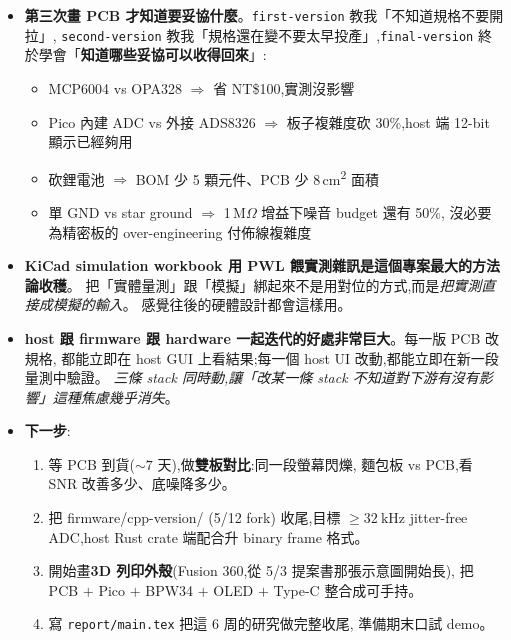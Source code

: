\begin{itemize}[leftmargin=2em,itemsep=0pt]
  \item \textbf{第三次畫 PCB 才知道要妥協什麼}。\texttt{first-version} 教我「不知道規格不要開拉」,
        \texttt{second-version} 教我「規格還在變不要太早投產」,\texttt{final-version}
        終於學會「\textbf{知道哪些妥協可以收得回來}」:
        \begin{itemize}[leftmargin=2em,itemsep=0pt]
          \item MCP6004 vs OPA328 \(\Rightarrow\) 省 NT\$100,實測沒影響
          \item Pico 內建 ADC vs 外接 ADS8326 \(\Rightarrow\) 板子複雜度砍 30\%,host 端
                12-bit 顯示已經夠用
          \item 砍鋰電池 \(\Rightarrow\) BOM 少 5 顆元件、PCB 少 8\,cm\textsuperscript{2} 面積
          \item 單 GND vs star ground \(\Rightarrow\) 1\,M\(\Omega\) 增益下噪音 budget 還有 50\%,
                沒必要為精密板的 over-engineering 付佈線複雜度
        \end{itemize}
  \item \textbf{KiCad simulation workbook 用 PWL 餵實測雜訊是這個專案最大的方法論收穫}。
        把「實體量測」跟「模擬」綁起來不是用對位的方式,而是\emph{把實測直接成模擬的輸入}。
        感覺往後的硬體設計都會這樣用。
  \item \textbf{host 跟 firmware 跟 hardware 一起迭代的好處非常巨大}。每一版 PCB 改規格,
        都能立即在 host GUI 上看結果;每一個 host UI 改動,都能立即在新一段量測中驗證。
        \emph{三條 stack 同時動,讓「改某一條 stack 不知道對下游有沒有影響」這種焦慮幾乎消失}。
  \item \textbf{下一步}:
        \begin{enumerate}[leftmargin=2em,itemsep=0pt]
          \item 等 PCB 到貨(\(\sim 7\) 天),做\textbf{雙板對比}:同一段螢幕閃爍,
                麵包板 vs PCB,看 SNR 改善多少、底噪降多少。
          \item 把 firmware/cpp-version/ (5/12 fork) 收尾,目標
                \(\geq \SI{32}{\kilo\hertz}\) jitter-free ADC,host Rust crate 端配合升 binary
                frame 格式。
          \item 開始畫\textbf{3D 列印外殼}(Fusion 360,從 5/3 提案書那張示意圖開始長),
                把 PCB \(+\) Pico \(+\) BPW34 \(+\) OLED \(+\) Type-C 整合成可手持。
          \item 寫 \texttt{report/main.tex} 把這 6 周的研究做完整收尾,
                準備期末口試 demo。
        \end{enumerate}
\end{itemize}
